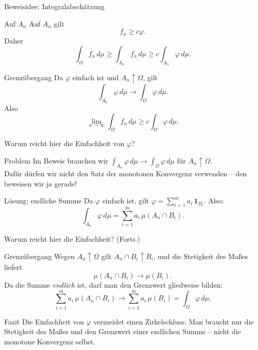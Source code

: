 \documentclass{beamer}
\begin{document}
\begin{frame}{Beweisidee: Integralabschätzung}
\begin{block}{Auf \(A_n\)}
Auf \(A_n\) gilt
\[
f_n\ge c\varphi.
\]
Daher
\[
\int_\Omega f_n\,d\mu
\ge
\int_{A_n} f_n\,d\mu
\ge
c\int_{A_n}\varphi\,d\mu.
\]
\end{block}

\begin{block}{Grenzübergang}
Da \(\varphi\) einfach ist und \(A_n\uparrow\Omega\), gilt
\[
\int_{A_n}\varphi\,d\mu
\to
\int_\Omega \varphi\,d\mu.
\]
Also
\[
\lim_{n\to\infty}\int_\Omega f_n\,d\mu
\ge
c\int_\Omega \varphi\,d\mu.
\]
\end{block}
\end{frame}

\begin{frame}{Warum reicht hier die Einfachheit von \(\varphi\)?}
\begin{block}{Problem}
Im Beweis brauchen wir \(\int_{A_n}\varphi\,d\mu\to\int_\Omega\varphi\,d\mu\) für \(A_n\uparrow\Omega\).
\\[4pt]
Dafür dürfen wir nicht den Satz der monotonen Konvergenz verwenden -- den beweisen wir ja gerade!
\end{block}

\begin{block}{Lösung: endliche Summe}
Da \(\varphi\) einfach ist, gilt \(\varphi=\sum_{i=1}^m a_i\,\mathbf 1_{B_i}\). Also:
\[
\int_{A_n}\varphi\,d\mu
=\sum_{i=1}^m a_i\,\mu(A_n\cap B_i).
\]
\end{block}
\end{frame}

\begin{frame}{Warum reicht hier die Einfachheit? (Forts.)}
\begin{block}{Grenzübergang}
Wegen \(A_n\uparrow\Omega\) gilt \(A_n\cap B_i\uparrow B_i\), und die Stetigkeit des Maßes liefert
\[
\mu(A_n\cap B_i)\to\mu(B_i).
\]
Da die Summe \emph{endlich} ist, darf man den Grenzwert gliedweise bilden:
\[
\sum_{i=1}^m a_i\,\mu(A_n\cap B_i)\to\sum_{i=1}^m a_i\,\mu(B_i)=\int_\Omega\varphi\,d\mu.
\]
\end{block}

\begin{block}{Fazit}
Die Einfachheit von \(\varphi\) vermeidet einen Zirkelschluss: Man braucht nur die Stetigkeit des Maßes und den Grenzwert einer endlichen Summe -- nicht die monotone Konvergenz selbst.
\end{block}
\end{frame}
\end{document}
